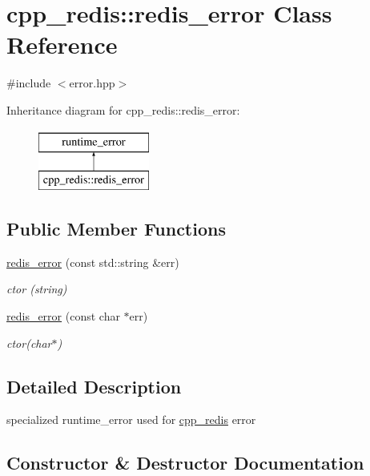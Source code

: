 \hypertarget{classcpp__redis_1_1redis__error}{}\section{cpp\+\_\+redis\+:\+:redis\+\_\+error Class Reference}
\label{classcpp__redis_1_1redis__error}


{\ttfamily \#include $<$error.\+hpp$>$}

Inheritance diagram for cpp\+\_\+redis\+:\+:redis\+\_\+error\+:\begin{figure}[H]
\begin{center}
\leavevmode
\includegraphics[height=2.000000cm]{classcpp__redis_1_1redis__error}
\end{center}
\end{figure}
\subsection*{Public Member Functions}
\begin{DoxyCompactItemize}
\item 
\hyperlink{classcpp__redis_1_1redis__error_a1445e654b3936c7f5aa1c298bcf24966}{redis\+\_\+error} (const std\+::string \&err)
\begin{DoxyCompactList}\small\item\em ctor (string) \end{DoxyCompactList}\item 
\hyperlink{classcpp__redis_1_1redis__error_a0ced25483119c2318b1a5a69cac1919f}{redis\+\_\+error} (const char $\ast$err)
\begin{DoxyCompactList}\small\item\em ctor(char$\ast$) \end{DoxyCompactList}\end{DoxyCompactItemize}


\subsection{Detailed Description}
specialized runtime\+\_\+error used for \hyperlink{namespacecpp__redis}{cpp\+\_\+redis} error 

\subsection{Constructor \& Destructor Documentation}
\mbox{\label{classcpp__redis_1_1redis__error_a1445e654b3936c7f5aa1c298bcf24966}} 
